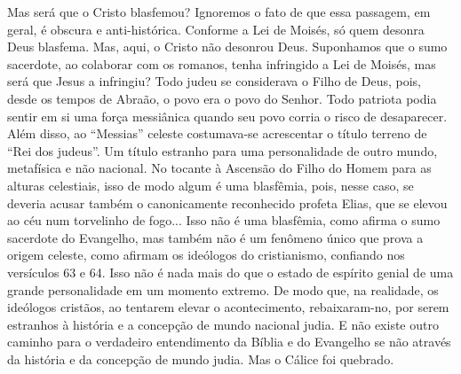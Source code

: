 Mas será que o Cristo blasfemou? Ignoremos o fato de que essa passagem,
em geral, é obscura e anti-histórica. Conforme a Lei de Moisés, só quem
desonra Deus blasfema. Mas, aqui, o Cristo não desonrou Deus. Suponhamos
que o sumo sacerdote, ao colaborar com os romanos, tenha infringido a
Lei de Moisés, mas será que Jesus a infringiu? Todo judeu se considerava
o Filho de Deus, pois, desde os tempos de Abraão, o povo era o povo do
Senhor. Todo patriota podia sentir em si uma força messiânica quando seu
povo corria o risco de desaparecer. Além disso, ao ``Messias'' celeste
costumava-se acrescentar o título terreno de ``Rei dos judeus''. Um
título estranho para uma personalidade de outro mundo, metafísica e não
nacional. No tocante à Ascensão do Filho do Homem para as alturas
celestiais, isso de modo algum é uma blasfêmia, pois, nesse caso, se
deveria acusar também o canonicamente reconhecido profeta Elias, que se
elevou ao céu num torvelinho de fogo... Isso não é uma blasfêmia, como
afirma o sumo sacerdote do Evangelho, mas também não é um fenômeno único
que prova a origem celeste, como afirmam os ideólogos do cristianismo,
confiando nos versículos 63 e 64. Isso não é nada mais do que o estado
de espírito genial de uma grande personalidade em um momento extremo. De
modo que, na realidade, os ideólogos cristãos, ao tentarem elevar o
acontecimento, rebaixaram-no, por serem estranhos à história e a
concepção de mundo nacional judia. E não existe outro caminho para o
verdadeiro entendimento da Bíblia e do Evangelho se não através da
história e da concepção de mundo judia. Mas o Cálice foi quebrado.

